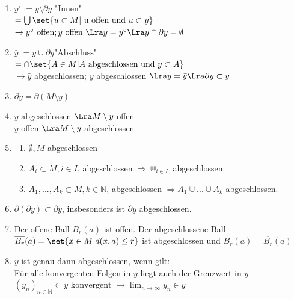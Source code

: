 \begin{enumerate}
    \item $ y^\circ := y \setminus \partial y$ "Innen" \\
        $= \bigcup \set{u \subset M | \text{ u offen und } u \subset y}$ \\
        $\rightarrow y^\circ \text{ offen}; y \text{ offen } \Lra y = y ^\circ \Lra y \cap \partial y = \emptyset$
    \item $\bar y := y \cup \partial y \text{"Abschluss"}$ \\
        $= \cap \set{A \in M | A \text{ abgeschlossen und } y \subset A}$ \\
        $\rightarrow \bar y$ abgeschlossen; $y$ abgeschlossen $\Lra y = \bar y \Lra \partial y \subset y$
    \item $\partial y = \partial (M \setminus y)$
    \item $y$ abgeschlossen $\Lra M \setminus y$ offen \\
    $y$ offen $\Lra M \setminus y$ abgeschlossen
    \item
        \begin{enumerate}
            \item $\emptyset, M$ abgeschlossen
            \item $A_i \subset M, i \in I$, abgeschlossen $\Rightarrow \displaystyle\Cup_{i \in I}$ abgeschlossen.
            \item $A_1,...,A_k \subset M, k \in \mathbb{N}$, abgeschlossen $\Rightarrow A_1 \cup ... \cup A_k$ abgeschlossen.
        \end{enumerate}
    \item $\partial (\partial y) \subset \partial y$, insbesonders ist $\partial y$ abgeschlossen.
    \item Der offene Ball $B_r(a)$ ist offen. Der abgeschlossene Ball $\overline{B_r}(a) = \set{x \in M | d(x,a) \le r}$ ist abgeschlossen und $\overline{ B_r(a)} = \overline{B_r}(a)$
    \item $y$ ist genau dann abgeschlossen, wenn gilt: \\
    Für alle konvergenten Folgen in $y$ liegt auch der Grenzwert in $y$ \\
    $(y_n)_{n \in \mathbb{N}} \subset y \text{ konvergent } \rightarrow \displaystyle\lim_{n\rightarrow \infty}y_n \in y$
\end{enumerate}